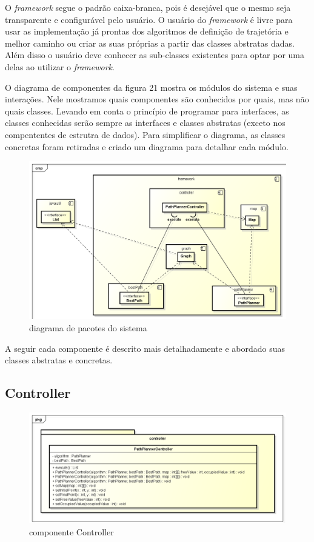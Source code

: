 O \textit{framework} segue o padrão caixa-branca, pois é desejável que o mesmo seja transparente e configurável pelo usuário. O usuário do \textit{framework} é livre para usar as implementação já prontas dos algoritmos de definição de trajetória e melhor caminho ou criar as suas próprias a partir das classes abstratas dadas. Além disso o usuário deve conhecer as sub-classes existentes para optar por uma delas ao utilizar o \textit{framework}.

O diagrama de componentes da figura 21 mostra os módulos do sistema e suas interações. Nele mostramos quais componentes são conhecidos por quais, mas não quais classes. Levando em conta o princípio de programar para interfaces, as classes conhecidas serão sempre as interfaces e classes abstratas (exceto nos compententes de estrutra de dados). Para simplificar o diagrama, as classes concretas foram retiradas e criado um diagrama para detalhar cada módulo.

\begin{figure}[h]
	\centering
	\label{fig21}
		\includegraphics[keepaspectratio=true,scale=0.4]{figuras/componentes.png}
	\caption{diagrama de pacotes do sistema}
\end{figure}

A seguir cada componente é descrito mais detalhadamente e abordado suas classes abstratas e concretas.

\subsection{Controller}

\begin{figure}[h]
	\centering
	\label{fig22}
		\includegraphics[keepaspectratio=true,scale=0.5]{figuras/pkgcontroller.png}
	\caption{componente Controller}
\end{figure}


